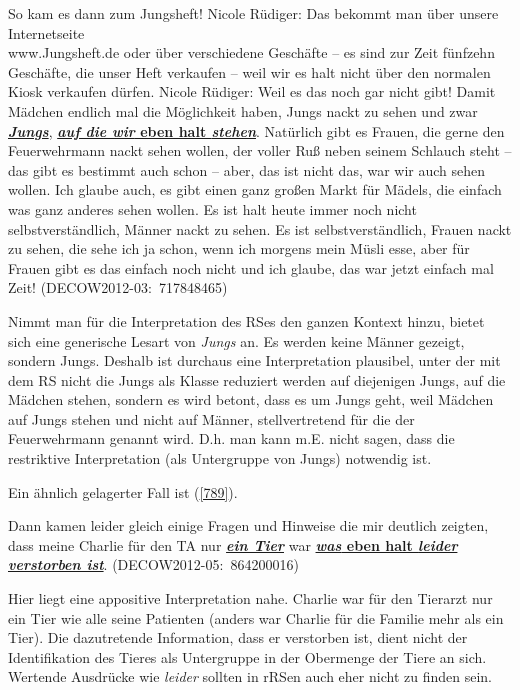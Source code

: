 \begin{exe}
	\ex\label{788} 
	\scriptsize
	So kam es dann zum Jungsheft! Nicole Rüdiger: Das bekommt man über unsere Internetseite\\ www.Jungsheft.de oder über verschiedene Geschäfte – es sind zur Zeit fünfzehn Geschäfte, die unser Heft verkaufen – weil wir es halt nicht über den normalen Kiosk verkaufen dürfen. Nicole Rüdiger: Weil es das noch gar nicht gibt! Damit Mädchen endlich mal die Möglichkeit haben, Jungs nackt zu sehen und zwar \underline{\textbf{\textit{Jungs}}}, \underline{\textbf{\textit{auf die wir} eben halt \textit{stehen}}}. Natürlich gibt es Frauen, die gerne den Feuerwehrmann nackt sehen wollen, der voller Ruß neben seinem Schlauch steht – das gibt es bestimmt auch schon – aber, das ist nicht das, war wir auch sehen wollen. Ich glaube auch, es gibt einen ganz großen Markt für Mädels, die einfach was ganz anderes sehen wollen. Es ist halt heute immer noch nicht selbstverständlich, Männer nackt zu sehen. Es ist selbstverständlich, Frauen nackt zu sehen, die sehe ich ja schon, wenn ich morgens mein Müsli esse, aber für Frauen gibt es das einfach noch nicht und ich glaube, das war jetzt einfach mal Zeit!
	\hfill\hbox{(DECOW2012-03: 717848465)}
\end{exe}
Nimmt man für die Interpretation des RSes den ganzen Kontext hinzu, bietet sich eine generische Lesart von \textit{Jungs} an. Es werden keine Männer gezeigt, sondern Jungs. Deshalb ist durchaus eine Interpretation plausibel, unter der mit dem RS nicht die Jungs als Klasse reduziert werden auf diejenigen Jungs, auf die Mädchen stehen, sondern es wird betont, dass es um Jungs geht, weil Mädchen auf Jungs stehen und nicht auf Männer, stellvertretend für die der Feuerwehrmann genannt wird. D.h. man kann m.E. nicht sagen, dass die restriktive Interpretation (als Untergruppe von Jungs) notwendig ist. 

Ein ähnlich gelagerter Fall ist (\ref{789}).
	
\begin{exe}
	\ex\label{789} 
	\scriptsize
	 Dann kamen leider gleich einige Fragen und Hinweise die mir deutlich zeigten, dass meine Charlie für den TA nur \underline{\textbf{\textit{ein Tier}}} war \underline{\textbf{\textit{was} eben halt \textit{leider verstorben ist}}}. 
	\hfill\hbox{(DECOW2012-05: 864200016)}
\end{exe}	    					   
Hier liegt eine appositive Interpretation nahe. Charlie war für den Tierarzt nur ein Tier wie alle seine Patienten (anders war Charlie für die Familie mehr als ein Tier). Die dazutretende Information, dass er verstorben ist, dient nicht der Identifikation des Tieres als Untergruppe in der Obermenge der Tiere an sich. Wertende Ausdrücke wie \textit{leider} sollten in rRSen auch eher nicht zu finden sein.

